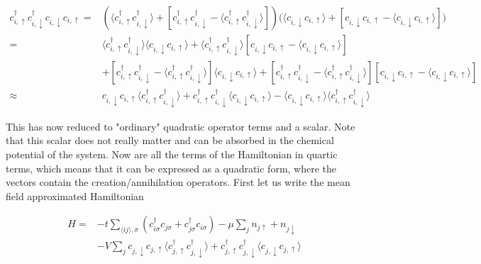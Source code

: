 \documentclass[11pt]{article}
\begin{document}
\begin{align}
	c_{i, \uparrow}^{\dagger}c_{i, \downarrow}^{\dagger} c_{i, \downarrow}c_{i, \uparrow} = &\left( \langle c_{i, \uparrow}^{\dagger}c_{i, \downarrow}^{\dagger} \rangle + [c_{i, \uparrow}^{\dagger}c_{i, \downarrow}^{\dagger} - \langle c_{i, \uparrow}^{\dagger}c_{i, \downarrow}^{\dagger} \rangle] \right) \Big( \langle c_{i, \downarrow}c_{i, \uparrow} \rangle + [c_{i, \downarrow}c_{i, \uparrow} - \langle c_{i, \downarrow}c_{i, \uparrow} \rangle] \Big) \\ %
=& \langle c_{i, \uparrow}^{\dagger}c_{i, \downarrow}^{\dagger} \rangle \langle c_{i, \downarrow}c_{i, \uparrow} \rangle +  \langle c_{i, \uparrow}^{\dagger}c_{i, \downarrow}^{\dagger} \rangle [c_{i, \downarrow}c_{i, \uparrow} - \langle c_{i, \downarrow}c_{i, \uparrow} \rangle] \nonumber \\
&+[c_{i, \uparrow}^{\dagger}c_{i, \downarrow}^{\dagger} - \langle c_{i, \uparrow}^{\dagger}c_{i, \downarrow}^{\dagger} \rangle]\langle c_{i, \downarrow}c_{i, \uparrow} \rangle + [c_{i, \uparrow}^{\dagger}c_{i, \downarrow}^{\dagger} - \langle c_{i, \uparrow}^{\dagger}c_{i, \downarrow}^{\dagger} \rangle][c_{i, \downarrow}c_{i, \uparrow} - \langle c_{i, \downarrow}c_{i, \uparrow} \rangle]  \nonumber \\
\approx& c_{i, \downarrow}c_{i, \uparrow} \langle c_{i, \uparrow}^{\dagger}c_{i, \downarrow}^{\dagger} \rangle  + c_{i, \uparrow}^{\dagger}c_{i, \downarrow}^{\dagger}\langle c_{i, \downarrow}c_{i, \uparrow} \rangle - \langle c_{i, \downarrow}c_{i, \uparrow} \rangle \langle c_{i, \uparrow}^{\dagger}c_{i, \downarrow}^{\dagger} \rangle
\end{align}

This has now reduced to "ordinary" quadratic operator terms and a scalar. Note that this scalar does not really matter and can be absorbed in the chemical potential of the system. Now are all the terms of the Hamiltonian in quartic terms, which means that it can be expressed as a quadratic form, where the vectors contain the creation/annihilation operators. First let us write the mean field approximated Hamiltonian

\begin{align}
	H = &-t \sum_{\langle i j\rangle, \sigma}\left(c_{i \sigma}^{\dagger} c_{j \sigma} + c_{j \sigma}^{\dagger} c_{i \sigma}\right) - \mu \sum_j n_{j \uparrow}+n_{j \downarrow}  \nonumber \\ 
	    &- V \sum_j  c_{j, \downarrow}c_{j, \uparrow} \langle c_{j, \uparrow}^{\dagger}c_{j, \downarrow}^{\dagger} \rangle  + c_{j, \uparrow}^{\dagger}c_{j, \downarrow}^{\dagger}\langle c_{j, \downarrow}c_{j, \uparrow} \rangle 
\end{align}
\end{document}
